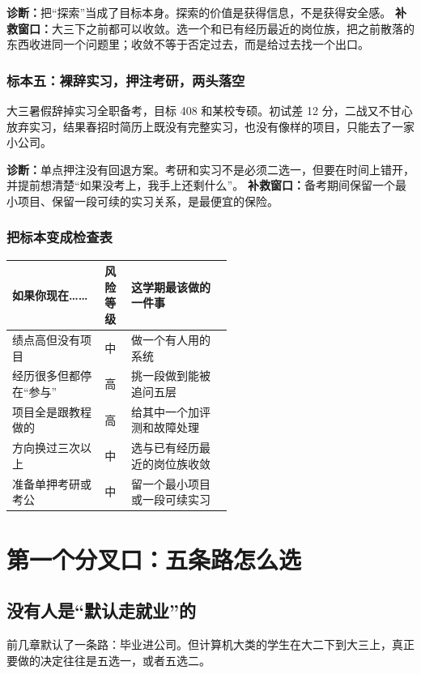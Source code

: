 \documentclass[UTF8,zihao=5,openany]{ctexbook}
\begin{document}
\textbf{诊断：}把“探索”当成了目标本身。探索的价值是获得信息，不是获得安全感。
\textbf{补救窗口：}大三下之前都可以收敛。选一个和已有经历最近的岗位族，把之前散落的东西收进同一个问题里；收敛不等于否定过去，而是给过去找一个出口。

\subsection{标本五：裸辞实习，押注考研，两头落空}
大三暑假辞掉实习全职备考，目标 408 和某校专硕。初试差 12 分，二战又不甘心放弃实习，结果春招时简历上既没有完整实习，也没有像样的项目，只能去了一家小公司。

\textbf{诊断：}单点押注没有回退方案。考研和实习不是必须二选一，但要在时间上错开，并提前想清楚“如果没考上，我手上还剩什么”。
\textbf{补救窗口：}备考期间保留一个最小项目、保留一段可续的实习关系，是最便宜的保险。

\subsection{把标本变成检查表}
\begin{toolbox}
\begin{center}\small
\begin{tabularx}{0.92\linewidth}{p{0.42\linewidth}p{0.12\linewidth}Y}
\toprule
如果你现在…… & 风险等级 & 这学期最该做的一件事 \\
\midrule
绩点高但没有项目 & 中 & 做一个有人用的系统 \\
经历很多但都停在“参与” & 高 & 挑一段做到能被追问五层 \\
项目全是跟教程做的 & 高 & 给其中一个加评测和故障处理 \\
方向换过三次以上 & 中 & 选与已有经历最近的岗位族收敛 \\
准备单押考研或考公 & 中 & 留一个最小项目或一段可续实习 \\
\bottomrule
\end{tabularx}
\end{center}
\end{toolbox}


\chapter{第一个分叉口：五条路怎么选}
\section{没有人是“默认走就业”的}
前几章默认了一条路：毕业进公司。但计算机大类的学生在大二下到大三上，真正要做的决定往往是五选一，或者五选二。
\end{document}
